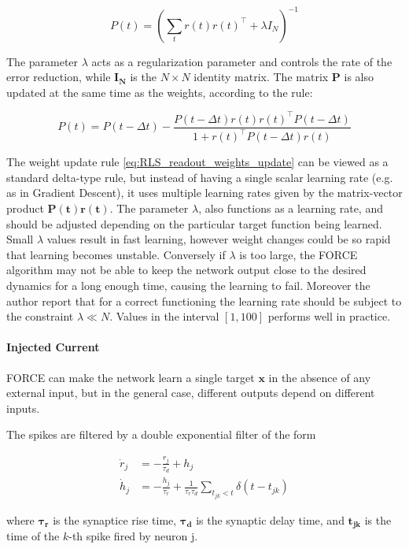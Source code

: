 \documentclass[10pt,a4paper, final]{report} %
\begin{document}
\begin{equation}
P(t) = (\sum_t r(t) r(t)^\intercal + \lambda I_N)^{-1}
\end{equation}

The parameter $\lambda$ acts as a regularization parameter and controls the rate of
the error reduction, while $\bm{I_N}$ is the $N \times N$ identity matrix.
The matrix $\bm{P}$ is also updated at the same time as the weights, according to the rule:

\begin{equation}
P(t) = P(t - \Delta t) - \frac{P(t - \Delta t) r(t) r(t)^\intercal P(t - \Delta t)}{1 + r(t)^\intercal P(t - \Delta t) r(t)}
\end{equation}

The weight update rule \eqref{eq:RLS_readout_weights_update} can be viewed as a standard delta-type rule, but instead of having a single scalar learning rate (e.g. as in Gradient Descent), it uses multiple learning rates given by the matrix-vector product $\bm{P(t) r(t)}$. The parameter $\lambda$, also functions as a learning rate, and should be adjusted depending on the particular target function being learned. Small $\lambda$ values result in fast learning, however weight changes could be so rapid that learning becomes unstable. Conversely if $\lambda$ is too large, the FORCE algorithm may not be able to keep the network output close to the desired dynamics for a long enough time, causing the learning to fail. Moreover the author report that for a correct functioning the learning rate should be subject to the constraint $\lambda \ll N$\cite{sussillo2009generating}. Values in the interval $[1,100]$ performs well in practice.

\paragraph{Injected Current}
FORCE can make the network learn a single target $\bm{x}$ in the absence of any external input, but in the general case, different outputs depend on different inputs. 

The spikes are filtered by a double exponential filter of the form

\begin{align}
\dot{r}_j &= - \frac{r_j}{\tau_d} + h_j\\
\dot{h}_j &= - \frac{h_j}{\tau_r} + \frac{1}{\tau_r \tau_d} \sum_{t_{jk} < t} \delta(t - t_{jk})
\end{align}

where $\bm{\tau_r}$ is the synaptice rise time, $\bm{\tau_d}$ is the synaptic delay time, and $\bm{t_{jk}}$ is the time of the $k$-th spike fired by neuron j. 
\end{document}
